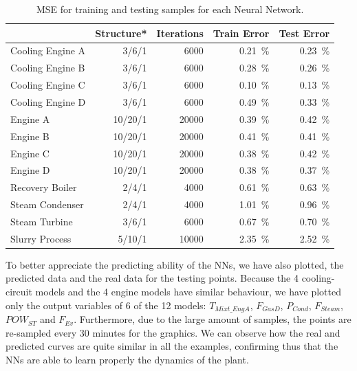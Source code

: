 \begin{table}[!t]
\label{tbl:mse}
  \centering
\caption{MSE for training and testing samples for each Neural Network.}
\label{MSE} %
\begin{tabular}{lrrrr} \toprule
 & Structure* & Iterations & Train Error & Test Error \\ \midrule
Cooling Engine A & 3/6/1 & \num{6000} & \SI{0.21}{\percent} & \SI{0.23}{\percent} \\
Cooling Engine B & 3/6/1 & \num{6000} & \SI{0.28}{\percent} & \SI{0.26}{\percent} \\
Cooling Engine C & 3/6/1 & \num{6000} & \SI{0.10}{\percent} & \SI{0.13}{\percent} \\
Cooling Engine D & 3/6/1 & \num{6000} & \SI{0.49}{\percent} & \SI{0.33}{\percent} \\
 Engine A & 10/20/1 & \num{20000} & \SI{0.39}{\percent} & \SI{0.42}{\percent} \\
 Engine B & 10/20/1 & \num{20000} & \SI{0.41}{\percent} & \SI{0.41}{\percent} \\
 Engine C & 10/20/1 & \num{20000} & \SI{0.38}{\percent} & \SI{0.42}{\percent} \\
 Engine D & 10/20/1 & \num{20000} & \SI{0.38}{\percent} & \SI{0.37}{\percent} \\
 Recovery Boiler & 2/4/1 & \num{4000} & \SI{0.61}{\percent} & \SI{0.63}{\percent} \\
 Steam Condenser & 2/4/1 & \num{4000} & \SI{1.01}{\percent} & \SI{0.96}{\percent} \\
 Steam Turbine & 3/6/1 & \num{6000} & \SI{0.67}{\percent} & \SI{0.70}{\percent} \\
 Slurry Process & 5/10/1 & \num{10000} & \SI{2.35}{\percent} & \SI{2.52}{\percent} \\
 \bottomrule
\end{tabular}
\vspace{-0.3cm}

\end{table}


To better appreciate the predicting ability of the NNs, we have also plotted, the predicted data and the real data for the testing points. Because the 4 cooling-circuit models and the 4 engine models have  similar behaviour, we have plotted only the output variables of 6 of the 12 models: $T_{Mixt\_EngA}$, $F_{GasD}$, $P_{Cond}$, $F_{Steam}$, $POW_{ST}$ and $F_{Ev}$. Furthermore, due to the large amount of samples, the points are re-sampled every 30 minutes for the graphics. We can observe how the  real and predicted curves are quite similar in all the examples, confirming thus that the NNs are able to learn properly the dynamics of the plant.


